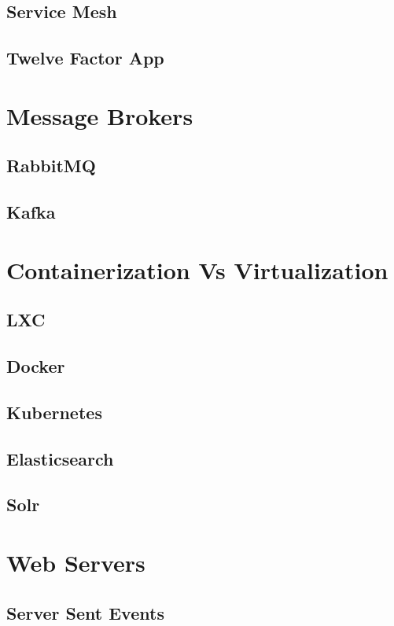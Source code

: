 \documentclass[a4paper]{article}
\begin{document}
    \subsection{Service Mesh}
    \subsection{Twelve Factor App}

    \newpage
    \section{Message Brokers}
    \subsection{RabbitMQ}
    \subsection{Kafka}

    \newpage
    \section{Containerization Vs Virtualization} 
    \subsection{LXC}
    \subsection{Docker}
    \subsection{Kubernetes}
    \subsection{Elasticsearch}
    \subsection{Solr}


    \newpage
    \section{Web Servers}
    \subsection{Server Sent Events}
\end{document}
